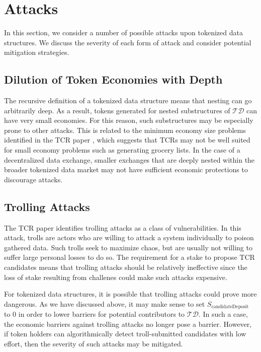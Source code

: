 \documentclass{llncs}
\begin{document}
\section{Attacks}

In this section, we consider a number of possible attacks upon tokenized data structures. We discuss the severity of each form of attack and consider potential mitigation strategies.

\subsection{Dilution of Token Economies with Depth}
The recursive definition of a tokenized data structure means that nesting can go arbitrarily deep. As a result, tokens generated for nested substructures of $\mathcal{TD}$ can have very small economies. For this reason, such substructures may be especially prone to other attacks. This is related to the minimum economy size problems identified in the TCR paper \cite{goldin2017tcr}, which suggests that TCRs may not be well suited for small economy problems such as generating grocery lists. In the case of a decentralized data exchange, smaller exchanges that are deeply nested within the broader tokenized data market may not have sufficient economic protections to discourage attacks.

\subsection{Trolling Attacks}
The TCR paper \cite{goldin2017tcr} identifies trolling attacks as a class of vulnerabilities. In this attack, trolls are actors who are willing to attack a system individually to poison gathered data. Such trolls seek to maximize chaos, but are usually not willing to suffer large personal losses to do so. The requirement for a stake to propose TCR candidates means that trolling attacks should be relatively ineffective since the loss of stake resulting from challenes could make such attacks expensive.

For tokenized data structures, it is possible that trolling attacks could prove more dangerous. As we have discussed above, it may make sense to set $S_\text{candidateDeposit}$ to $0$ in order to lower barriers for potential contributors to $\mathcal{TD}$. In such a case, the economic barriers against trolling attacks no longer pose a barrier. However, if token holders can algorithmically detect troll-submitted candidates with low effort, then the severity of such attacks may be mitigated.
\end{document}
